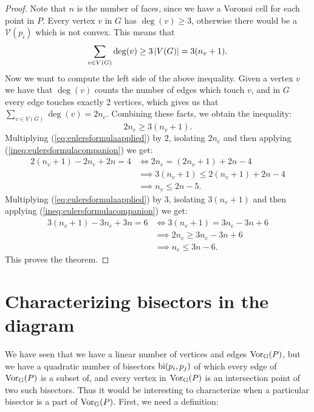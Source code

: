 \begin{proof}
Note that $n$ is the number of faces, since we have a Voronoi cell for each point in $P$. Every vertex $v$ in $G$ has $\deg(v) \geq 3$, otherwise there would be a $\mathcal{V}(p_i)$ which is not convex. This means that
\[
    \sum_{v \in V(G)} \deg(v) \geq 3 \left\lvert V(G) \right\rvert = 3(n_v + 1).
\]
Now we want to compute the left side of the above inequality. Given a vertex $v$ we have that $\deg(v)$ counts the number of edges which touch $v$, and in $G$ every edge touches exactly 2 vertices, which gives us that $\sum_{v \in V(G)} \deg(v) = 2 n_e$. Combining these facts, we obtain the inequality:
\begin{equation} \label{ineq:eulersformulacompanion}
    2 n_e \geq 3(n_v + 1).
\end{equation}
Multiplying (\ref{eq:eulersformulaapplied}) by $2$, isolating $2 n_e$ and then applying (\ref{ineq:eulersformulacompanion}) we get:
\begin{align*}
    2 (n_v + 1) - 2 n_e + 2 n = 4
    &\iff 2 n_e = (2 n_v + 1) + 2n - 4 \\
    &\implies 3(n_v + 1) \leq 2 (n_v + 1) + 2n - 4 \\
    &\implies n_v \leq 2n - 5.
\end{align*}
Multiplying (\ref{eq:eulersformulaapplied}) by $3$, isolating $3 (n_v + 1)$ and then applying (\ref{ineq:eulersformulacompanion}) we get:
\begin{align*}
    3 (n_v + 1) - 3 n_e + 3 n = 6
    &\iff 3 (n_v + 1) = 3 n_e - 3n + 6 \\
    &\implies 2 n_e \geq 3n_e - 3n + 6 \\
    &\implies n_e \leq 3n - 6.
\end{align*}
This proves the theorem.
\end{proof}

\section{Characterizing bisectors in the diagram}
We have seen that we have a linear number of vertices and edges $\operatorname{Vor_{G}}(P)$, but we have a quadratic number of bisectors $\operatorname{bi}(p_i, p_j)$ of which every edge of $\operatorname{Vor_{G}}(P)$ is a subset of, and every vertex in $\operatorname{Vor_{G}}(P)$ is an intersection point of two such bisectors. Thus it would be interesting to characterize when a particular bisector is a part of $\operatorname{Vor_{G}}(P)$. First, we need a definition:

